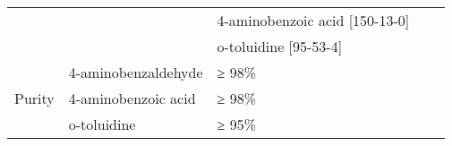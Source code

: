 \begin{table}[H]
\begin{tabularx}{\linewidth}{l|XXX|l}
\multicolumn{2}{|c|}{}                                                     & 4-aminobenzoic acid {[}150-13-0{]}                                                                                                                                                                                                                                                                                                                                                                                                      \\ \cline{3-3} 
\multicolumn{2}{|c|}{}                                                     & o-toluidine {[}95-53-4{]}                                                                                                                                                                                                                                                                                                                                                                                                               \\ \hline
\multirow{3}{*}{Purity}                              & 4-aminobenzaldehyde & ≥ 98\%                                                                                                                                                                                                                                                                                                                                                                                                                                  \\ \cline{2-3} 
                                                     & 4-aminobenzoic acid & ≥ 98\%                                                                                                                                                                                                                                                                                                                                                                                                                                  \\ \cline{2-3} 
                                                     & o-toluidine         & ≥ 95\%                                                                                                                                                                                                                                                                                                                                                                                                                                  \\ \hline

\end{tabularx}
\end{table}
